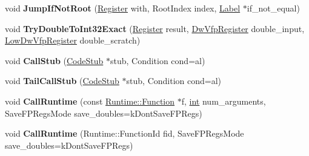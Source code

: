 \begin{DoxyCompactItemize}
\item 
\mbox{\label{classv8_1_1internal_1_1MacroAssembler_a2c433ea6b27ac33ad2b6ef6b1a751eb9}} 
void {\bfseries Jump\+If\+Not\+Root} (\mbox{\hyperlink{classv8_1_1internal_1_1Register}{Register}} with, Root\+Index index, \mbox{\hyperlink{classv8_1_1internal_1_1Label}{Label}} $\ast$if\+\_\+not\+\_\+equal)
\item 
\mbox{\label{classv8_1_1internal_1_1MacroAssembler_aae314891dd5d2ee1ee5768a9ce63b114}} 
void {\bfseries Try\+Double\+To\+Int32\+Exact} (\mbox{\hyperlink{classv8_1_1internal_1_1Register}{Register}} result, \mbox{\hyperlink{classv8_1_1internal_1_1DwVfpRegister}{Dw\+Vfp\+Register}} double\+\_\+input, \mbox{\hyperlink{classv8_1_1internal_1_1LowDwVfpRegister}{Low\+Dw\+Vfp\+Register}} double\+\_\+scratch)
\item 
\mbox{\label{classv8_1_1internal_1_1MacroAssembler_a7d21a7004bdf85665462d7dcc8216376}} 
void {\bfseries Call\+Stub} (\mbox{\hyperlink{classv8_1_1internal_1_1CodeStub}{Code\+Stub}} $\ast$stub, Condition cond=al)
\item 
\mbox{\label{classv8_1_1internal_1_1MacroAssembler_a2e979aa8359c6965ff35ab75551e4e9c}} 
void {\bfseries Tail\+Call\+Stub} (\mbox{\hyperlink{classv8_1_1internal_1_1CodeStub}{Code\+Stub}} $\ast$stub, Condition cond=al)
\item 
\mbox{\label{classv8_1_1internal_1_1MacroAssembler_a37081c297a4c533e549cc58167f7ccaa}} 
void {\bfseries Call\+Runtime} (const \mbox{\hyperlink{structv8_1_1internal_1_1Runtime_1_1Function}{Runtime\+::\+Function}} $\ast$f, \mbox{\hyperlink{classint}{int}} num\+\_\+arguments, Save\+F\+P\+Regs\+Mode save\+\_\+doubles=k\+Dont\+Save\+F\+P\+Regs)
\item 
\mbox{\label{classv8_1_1internal_1_1MacroAssembler_a797b53d578cd762b40c56f4485bf584e}} 
void {\bfseries Call\+Runtime} (Runtime\+::\+Function\+Id fid, Save\+F\+P\+Regs\+Mode save\+\_\+doubles=k\+Dont\+Save\+F\+P\+Regs)
\item 
\mbox{\label{classv8_1_1internal_1_1MacroAssembler_a87a8fd8a93b463d8485753c6d0d0465e}} 

\end{DoxyCompactItemize}
